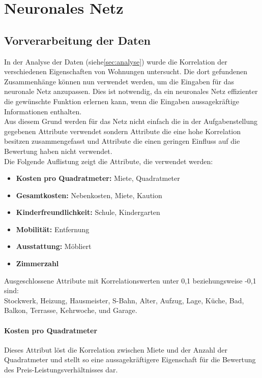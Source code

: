 \section{Neuronales Netz}\label{sec:nn}
\subsection{Vorverarbeitung der Daten}
In der Analyse der Daten (siehe\autoref{sec:analyse}) wurde die Korrelation
der verschiedenen Eigenschaften von Wohnungen untersucht. Die dort gefundenen
Zusammenhänge können nun verwendet werden, um die Eingaben für das neuronale
Netz anzupassen. Dies ist notwendig, da ein neuronales Netz effizienter
die gewünschte Funktion erlernen kann, wenn die Eingaben aussagekräftige
Informationen enthalten. \\
Aus diesem Grund werden für das Netz nicht einfach die in der Aufgabenstellung
gegebenen Attribute verwendet sondern Attribute die eine hohe Korrelation besitzen
zusammengefasst und Attribute die einen geringen Einfluss auf die Bewertung haben
nicht verwendet. \\
Die Folgende Auflistung zeigt die Attribute, die verwendet werden:
\begin{itemize}\label{lst:Eigenschaften}
    \item \textbf{Kosten pro Quadratmeter:} Miete, Quadratmeter
    \item \textbf{Gesamtkosten:} Nebenkosten, Miete, Kaution
    \item \textbf{Kinderfreundlichkeit:} Schule, Kindergarten
    \item \textbf{Mobilität:} Entfernung
    \item \textbf{Ausstattung:} Möbliert
    \item \textbf{Zimmerzahl}
\end{itemize}

Ausgeschlossene Attribute mit Korrelationswerten unter 0,1 beziehungsweise -0,1 sind:\\
Stockwerk, Heizung, Hausmeister, S-Bahn, Alter, Aufzug, Lage, Küche, Bad, Balkon, Terrasse, Kehrwoche,
und Garage.

\paragraph{Kosten pro Quadratmeter}
Dieses Attribut löst die Korrelation zwischen Miete und der Anzahl der Quadratmeter und
stellt so eine aussagekräftigere Eigenschaft für die Bewertung des Preis-Leistungsverhältnisses dar.


